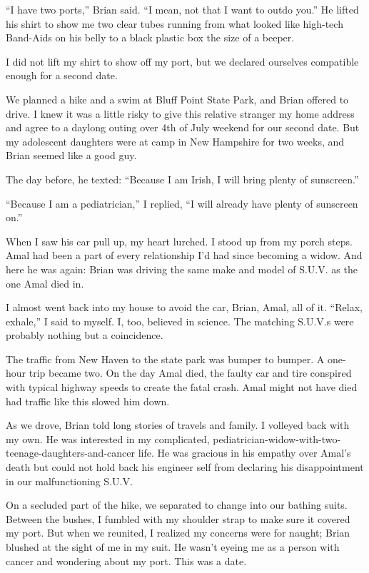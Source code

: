 ``I have two ports,'' Brian said. ``I mean, not that I want to outdo
you.'' He lifted his shirt to show me two clear tubes running from what
looked like high-tech Band-Aids on his belly to a black plastic box the
size of a beeper.

I did not lift my shirt to show off my port, but we declared ourselves
compatible enough for a second date.

We planned a hike and a swim at Bluff Point State Park, and Brian
offered to drive. I knew it was a little risky to give this relative
stranger my home address and agree to a daylong outing over 4th of July
weekend for our second date. But my adolescent daughters were at camp in
New Hampshire for two weeks, and Brian seemed like a good guy.

The day before, he texted: ``Because I am Irish, I will bring plenty of
sunscreen.''

``Because I am a pediatrician,'' I replied, ``I will already have plenty
of sunscreen on.''

When I saw his car pull up, my heart lurched. I stood up from my porch
steps. Amal had been a part of every relationship I'd had since becoming
a widow. And here he was again: Brian was driving the same make and
model of S.U.V. as the one Amal died in.

I almost went back into my house to avoid the car, Brian, Amal, all of
it. ``Relax, exhale,'' I said to myself. I, too, believed in science.
The matching S.U.V.s were probably nothing but a coincidence.

The traffic from New Haven to the state park was bumper to bumper. A
one-hour trip became two. On the day Amal died, the faulty car and tire
conspired with typical highway speeds to create the fatal crash. Amal
might not have died had traffic like this slowed him down.

As we drove, Brian told long stories of travels and family. I volleyed
back with my own. He was interested in my complicated,
pediatrician-widow-with-two-teenage-daughters-and-cancer life. He was
gracious in his empathy over Amal's death but could not hold back his
engineer self from declaring his disappointment in our malfunctioning
S.U.V.

On a secluded part of the hike, we separated to change into our bathing
suits. Between the bushes, I fumbled with my shoulder strap to make sure
it covered my port. But when we reunited, I realized my concerns were
for naught; Brian blushed at the sight of me in my suit. He wasn't
eyeing me as a person with cancer and wondering about my port. This was
a date.

